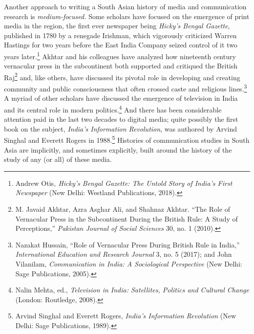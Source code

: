 \documentclass{tufte-handout}
\begin{document}
Another approach to writing a South Asian history of media and
communication research is \emph{medium-focused.} Some scholars have
focused on the emergence of print media in the region, the first ever
newspaper being \emph{Hicky's Bengal Gazette}, published in 1780 by a
renegade Irishman, which vigorously criticized Warren Hastings for two
years before the East India Company seized control of it two years
later.\footnote{Andrew Otis\emph{, Hicky's Bengal Gazette: The Untold
  Story of India's First Newspaper} (New Delhi: Westland Publications,
  2018).} Akhtar and his colleagues have analyzed how nineteenth century
vernacular press in the subcontinent both supported and critiqued the
British Raj\footnote{M. Javaid Akhtar, Azra Asghar Ali, and Shahnaz
  Akhtar. ``The Role of Vernacular Press in the Subcontinent During the
  British Rule: A Study of Perceptions,'' \emph{Pakistan Journal of
  Social Sciences} 30, no. 1 (2010).} and, like others, have discussed
its pivotal role in developing and creating community and public
consciousness that often crossed caste and religious lines.\footnote{Nazakat
  Hussain, ``Role of Vernacular Press During British Rule in India,''
  \emph{International Education and Research Journal} 3, no. 5 (2017);
  and John Vilanilam, \emph{Communication in India: A Sociological
  Perspective} (New Delhi: Sage Publications, 2005).} A myriad of other
scholars have discussed the emergence of television in India and its
central role in modern politics.\footnote{Nalin Mehta, ed.,
  \emph{Television in India: Satellites, Politics and Cultural Change}
  (London: Routledge, 2008).} And there has been considerable attention
paid in the last two decades to digital media; quite possibly the first
book on the subject, \emph{India's Information Revolution}, was authored
by Arvind Singhal and Everett Rogers in 1988.\footnote{Arvind Singhal
  and Everett Rogers, \emph{India's Information Revolution} (New Delhi:
  Sage Publications, 1989).} Histories of communication studies in South
Asia are implicitly, and sometimes explicitly, built around the history
of the study of any (or all) of these media.
\end{document}
